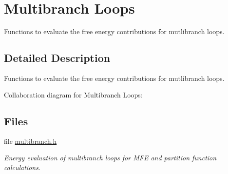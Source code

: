 \hypertarget{group__eval__loops__mb}{}\section{Multibranch Loops}
\label{group__eval__loops__mb}


Functions to evaluate the free energy contributions for mutlibranch loops.  




\subsection{Detailed Description}
Functions to evaluate the free energy contributions for mutlibranch loops. 

Collaboration diagram for Multibranch Loops\+:
\subsection*{Files}
\begin{DoxyCompactItemize}
\item 
file \mbox{\hyperlink{multibranch_8h}{multibranch.\+h}}
\begin{DoxyCompactList}\small\item\em Energy evaluation of multibranch loops for M\+FE and partition function calculations. \end{DoxyCompactList}\end{DoxyCompactItemize}
